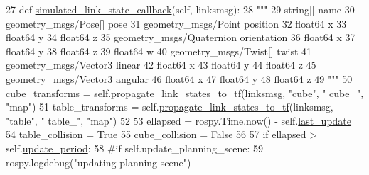 \begin{DoxyCode}
27     \textcolor{keyword}{def }\hyperlink{classfake__cube__perception__node_1_1FakePerceptionNode_ac1127eae8d2eda994b22873529bd198f}{simulated\_link\_state\_callback}(self, linksmsg):
28         \textcolor{stringliteral}{"""}
29 \textcolor{stringliteral}{        string[] name}
30 \textcolor{stringliteral}{        geometry\_msgs/Pose[] pose}
31 \textcolor{stringliteral}{          geometry\_msgs/Point position}
32 \textcolor{stringliteral}{            float64 x}
33 \textcolor{stringliteral}{            float64 y}
34 \textcolor{stringliteral}{            float64 z}
35 \textcolor{stringliteral}{          geometry\_msgs/Quaternion orientation}
36 \textcolor{stringliteral}{            float64 x}
37 \textcolor{stringliteral}{            float64 y}
38 \textcolor{stringliteral}{            float64 z}
39 \textcolor{stringliteral}{            float64 w}
40 \textcolor{stringliteral}{        geometry\_msgs/Twist[] twist}
41 \textcolor{stringliteral}{          geometry\_msgs/Vector3 linear}
42 \textcolor{stringliteral}{            float64 x}
43 \textcolor{stringliteral}{            float64 y}
44 \textcolor{stringliteral}{            float64 z}
45 \textcolor{stringliteral}{          geometry\_msgs/Vector3 angular}
46 \textcolor{stringliteral}{            float64 x}
47 \textcolor{stringliteral}{            float64 y}
48 \textcolor{stringliteral}{            float64 z}
49 \textcolor{stringliteral}{        """}
50         cube\_transforms = self.\hyperlink{classfake__cube__perception__node_1_1FakePerceptionNode_aeac788f768e625ecbe445c6af105d3f8}{propagate\_link\_states\_to\_tf}(linksmsg, \textcolor{stringliteral}{"cube"}, \textcolor{stringliteral}{"
      cube\_"}, \textcolor{stringliteral}{"map"})
51         table\_transforms = self.\hyperlink{classfake__cube__perception__node_1_1FakePerceptionNode_aeac788f768e625ecbe445c6af105d3f8}{propagate\_link\_states\_to\_tf}(linksmsg, \textcolor{stringliteral}{"table"}, \textcolor{stringliteral}{"
      table\_"}, \textcolor{stringliteral}{"map"})
52 
53         ellapsed = rospy.Time.now() - self.\hyperlink{classfake__cube__perception__node_1_1FakePerceptionNode_a2f5f0b4e0a1483187b2a84552df7edc1}{last\_update}
54         table\_collision = \textcolor{keyword}{True}
55         cube\_collision = \textcolor{keyword}{False}
56 
57         \textcolor{keywordflow}{if} ellapsed > self.\hyperlink{classfake__cube__perception__node_1_1FakePerceptionNode_a3df1532cfe1c0b4ed99346a498150c73}{update\_period}:
58         \textcolor{comment}{#if self.update\_planning\_scene:}
59           rospy.logdebug(\textcolor{stringliteral}{"updating planning scene"})

\end{DoxyCode}
